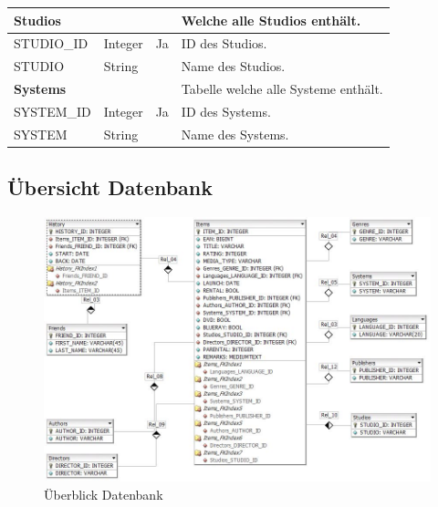 \begin{longtable}{|l|l|l|l|}
	\textbf{Studios} & & & Welche alle Studios enthält. \\ \hline
	\rowcolor{DarkSeaGreen} STUDIO\_ID & Integer & Ja & ID des Studios. \\ \hline
	STUDIO & String & & Name des Studios. \\ \hline
	\rowcolor{DarkSeaGreen} \textbf{Systems} & & & Tabelle welche alle Systeme enthält. \\ \hline
	SYSTEM\_ID & Integer & Ja & ID des Systems. \\ \hline
	\rowcolor{DarkSeaGreen} SYSTEM & String & & Name des Systems. \\ \hline
\end{longtable}

\newpage

\begin{landscape}
	\subsection{Übersicht Datenbank}
	\label{subsec:UebersichtDB}
	\begin{figure}[htbp]
		\centering
		\includegraphics[scale=0.6]{pic/DbDesign}
		\caption{Überblick Datenbank}
	\end{figure}
\end{landscape}